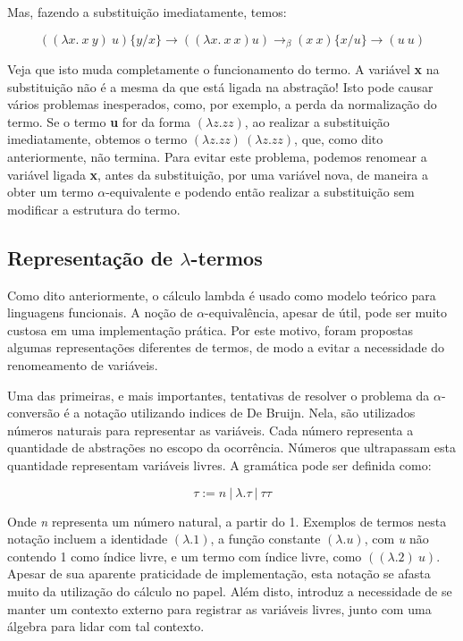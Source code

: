 Mas, fazendo a substituição imediatamente, temos:

\[ ((\lambda x.\ x\ y)\ u)\{y/x\} \rightarrow ((\lambda x.\ x\ x) u)
\rightarrow_\beta (x\ x)\{x/u\} \rightarrow (u\ u) \]

Veja que isto muda completamente o funcionamento do termo. A variável \textbf{x}
na substituição não é a mesma da que está ligada na abstração! Isto pode causar
vários problemas inesperados, como, por exemplo, a perda da normalização do
termo. Se o termo \textbf{u} for da forma $(\lambda z. z z)$, ao realizar a
substituição imediatamente, obtemos o termo $(\lambda z. z z)\ (\lambda z. z z)$,
que, como dito anteriormente, não termina.
Para evitar este problema, podemos renomear a variável ligada \textbf{x}, antes
da substituição, por uma variável nova, de maneira a obter um termo
$\alpha$-equivalente e podendo então realizar a substituição sem modificar a
estrutura do termo.

\subsection{Representação de $\lambda$-termos}
\label{sub:int_lnr}

Como dito anteriormente, o cálculo lambda é usado como modelo teórico para
linguagens funcionais. A noção de $\alpha$-equivalência, apesar de útil, pode ser
muito custosa em uma implementação prática. Por este motivo, foram propostas
algumas representações diferentes de termos, de modo a evitar a necessidade do
renomeamento de variáveis. 

Uma das primeiras, e mais importantes, tentativas de resolver o problema da
$\alpha$-conversão é a notação utilizando indices de De Bruijn. Nela, são
utilizados números naturais para representar as variáveis. Cada número
representa a quantidade de abstrações no escopo da ocorrência. Números que
ultrapassam esta quantidade representam variáveis livres. A gramática pode ser
definida como:

\[ \tau := n\ |\ \lambda . \tau\ |\ \tau \tau \]

Onde \textit{n} representa um número natural, a partir do 1. Exemplos de termos
nesta notação incluem a identidade $(\lambda. 1)$, a função constante $(\lambda.
u)$, com \textit{u} não contendo 1 como índice livre, e um termo com índice
livre, como $((\lambda.2)\ u)$. Apesar de sua aparente praticidade de
implementação, esta notação se afasta muito da utilização do cálculo no papel.
Além disto, introduz a necessidade de se manter um contexto externo para
registrar as variáveis livres, junto com uma álgebra para lidar com tal
contexto.

